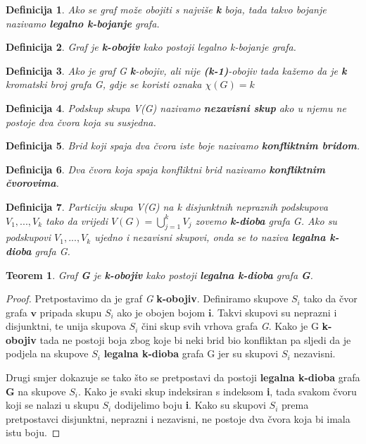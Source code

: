 \documentclass[times, utf8, diplomski, numeric]{fer}
\newtheorem{definition}{Definicija}
\newtheorem{theorem}{Teorem}
\begin{document}
\begin{definition}
Ako se graf može obojiti s najviše \textbf{k} boja, tada takvo bojanje nazivamo \textbf{legalno k-bojanje} grafa. 
\end{definition}

\begin{definition}
Graf je \textbf{k-obojiv} kako postoji legalno k-bojanje grafa.
\end{definition}


\begin{definition}
Ako je graf G \textbf{k}-obojiv, ali nije \textbf{(k-1)}-obojiv tada kažemo da je \textbf{k} kromatski broj grafa G, gdje se koristi oznaka $\chi(G)=k$  
\end{definition}


\begin{definition}
Podskup skupa V(G) nazivamo \textbf{nezavisni skup} ako u njemu ne postoje dva čvora koja su susjedna.  
\end{definition}

\begin{definition}
Brid koji spaja dva čvora iste boje nazivamo \textbf{konfliktnim bridom}.
\end{definition}

\begin{definition}
Dva čvora koja spaja konfliktni brid nazivamo \textbf{konfliktnim čvorovima}.
\end{definition}

\begin{definition}
Particiju skupa V(G) na k disjunktnih nepraznih podskupova $V_1,..., V_k$
 tako da vrijedi $V(G) = \bigcup_{j=1}^{k}V_j$ zovemo \textbf{k-dioba} grafa G. Ako su podskupovi  $V_1 ,..., V_k$  ujedno i nezavisni skupovi, onda se to naziva \textbf{legalna k-dioba} grafa G.
\end{definition}

\begin{theorem}
\label{thm:dioba}
Graf \textbf{G} je \textbf{k-obojiv} kako postoji \textbf{legalna k-dioba} grafa \textbf{G}.
\end{theorem}

\begin{proof}
Pretpostavimo da je graf \emph{G} \textbf{k-obojiv}. Definiramo skupove $S_i$ tako da čvor grafa $\mathbf{v}$ pripada skupu $S_i$ ako je obojen bojom $\mathbf{i}$. Takvi skupovi su neprazni i disjunktni, te unija skupova $S_i$ čini skup svih vrhova grafa \emph{G}. Kako je G \textbf{k-obojiv} tada ne postoji boja zbog koje bi neki brid bio konfliktan pa sljedi da je podjela na skupove $S_i$ \textbf{legalna k-dioba} grafa G jer su skupovi $S_i$ nezavisni. 

Drugi smjer dokazuje se tako što se pretpostavi da postoji \textbf{legalna k-dioba} grafa \textbf{G} na skupove $S_i$. Kako je svaki skup indeksiran s indeksom \textbf{i}, tada svakom čvoru koji se nalazi u skupu $S_i$ dodijelimo boju \textbf{i}. Kako su skupovi $S_i$ prema pretpostavci disjunktni, neprazni i nezavisni, ne postoje dva čvora koja bi imala istu boju.
\end{proof}
\end{document}
